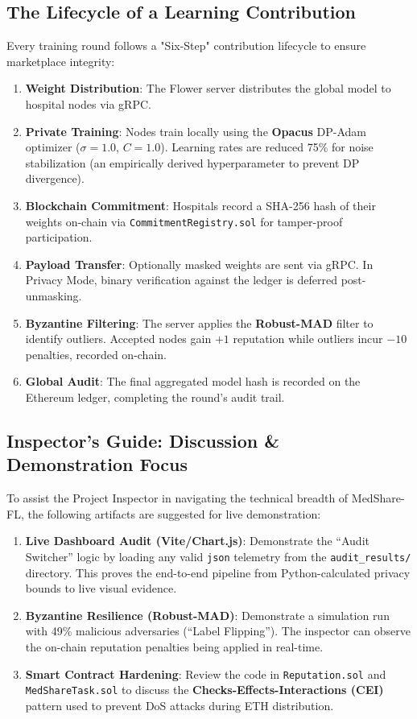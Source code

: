 \documentclass[10pt, a4paper, twocolumn]{article}
\begin{document}
\subsection{The Lifecycle of a Learning Contribution}
Every training round follows a "Six-Step" contribution lifecycle to ensure marketplace integrity:
\begin{enumerate}
    \item \textbf{Weight Distribution}: The Flower server distributes the global model to hospital nodes via gRPC.
    \item \textbf{Private Training}: Nodes train locally using the \textbf{Opacus} DP-Adam optimizer ($\sigma=1.0$, $C=1.0$). Learning rates are reduced 75\% for noise stabilization (an empirically derived hyperparameter to prevent DP divergence).
    \item \textbf{Blockchain Commitment}: Hospitals record a SHA-256 hash of their weights on-chain via \texttt{CommitmentRegistry.sol} for tamper-proof participation.
    \item \textbf{Payload Transfer}: Optionally masked weights are sent via gRPC. In Privacy Mode, binary verification against the ledger is deferred post-unmasking.
    \item \textbf{Byzantine Filtering}: The server applies the \textbf{Robust-MAD} filter to identify outliers. Accepted nodes gain $+1$ reputation while outliers incur $-10$ penalties, recorded on-chain.
    \item \textbf{Global Audit}: The final aggregated model hash is recorded on the Ethereum ledger, completing the round's audit trail.
\end{enumerate}

\subsection{Inspector's Guide: Discussion \& Demonstration Focus}
To assist the Project Inspector in navigating the technical breadth of MedShare-FL, the following artifacts are suggested for live demonstration:

\begin{enumerate}
    \item \textbf{Live Dashboard Audit (Vite/Chart.js)}: Demonstrate the ``Audit Switcher'' logic by loading any valid \texttt{json} telemetry from the \texttt{audit\_results/} directory. This proves the end-to-end pipeline from Python-calculated privacy bounds to live visual evidence.
    \item \textbf{Byzantine Resilience (Robust-MAD)}: Demonstrate a simulation run with 49\% malicious adversaries (``Label Flipping''). The inspector can observe the on-chain reputation penalties being applied in real-time.
    \item \textbf{Smart Contract Hardening}: Review the code in \texttt{Reputation.sol} and \texttt{MedShareTask.sol} to discuss the \textbf{Checks-Effects-Interactions (CEI)} pattern used to prevent DoS attacks during ETH distribution.
\end{enumerate}
\end{document}

